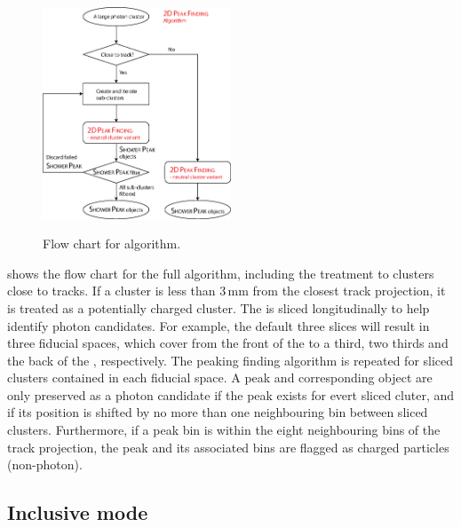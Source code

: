 \begin{figure}[tbph]
\centering
{\includegraphics[width=0.5\textwidth]{photon/2DpeakFindingTrack}}
\caption[Flow chart for \peakFinding algorithm.]
{Flow chart for \peakFinding algorithm.}
\label{fig:photonPeakFindingFlow}
\end{figure}

 shows the flow chart for the full \peakFinding algorithm, including the treatment to clusters close to tracks. If a cluster is less than 3\,mm from the closest track projection, it is treated as a potentially charged cluster. The \ECAL is sliced longitudinally to help identify photon candidates. For example, the default three slices will result in three \ECAL fiducial spaces, which cover from the front of the \ECAL to a third, two thirds and the back of the \ECAL, respectively. The peaking finding algorithm is repeated for sliced clusters contained in each fiducial space. A peak and corresponding \ShowerPeak object  are only preserved as a photon candidate if the peak exists for evert sliced cluter, and if its position is shifted by no more than one neighbouring bin between sliced clusters. Furthermore, if a peak bin is within the eight neighbouring bins of the track projection, the peak and its associated bins are flagged as charged particles (non-photon).

\subsection{Inclusive mode}
\label{sec:photonPeakFindingInclusive}

